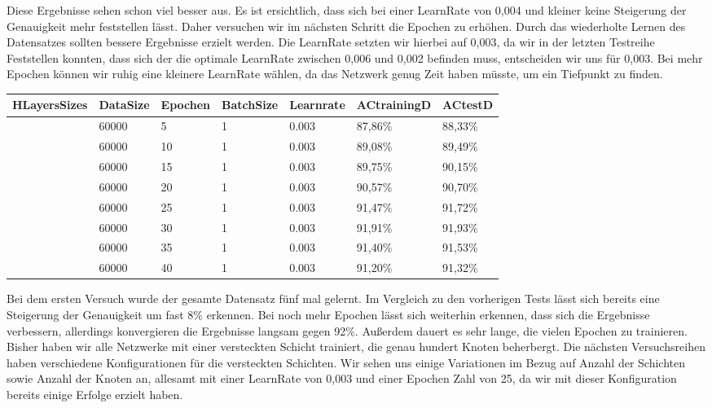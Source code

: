 \documentclass[12pt]{article}
\begin{document}
	Diese Ergebnisse sehen schon viel besser aus. Es ist ersichtlich, dass sich bei einer LearnRate von 0,004 und kleiner keine Steigerung der Genauigkeit mehr feststellen lässt. Daher versuchen wir im nächsten Schritt die Epochen zu erhöhen. Durch das wiederholte Lernen des Datensatzes sollten bessere Ergebnisse erzielt werden. Die LearnRate setzten wir hierbei auf 0,003, da wir in der letzten Testreihe Feststellen konnten, dass sich der die optimale LearnRate zwischen 0,006 und 0,002 befinden muss, entscheiden wir uns für 0,003. Bei mehr Epochen können wir ruhig eine kleinere LearnRate wählen, da das Netzwerk genug Zeit haben müsste, um ein Tiefpunkt zu finden.
\begin{table}[H]
    \centering
    \begin{tabular}{|l|l|l|l|l|l|l|}
    \hline
        HLayersSizes & DataSize & Epochen & BatchSize & Learnrate & ACtrainingD & ACtestD \\ \hline
        [784, 100, 10] & 60000 & 5 & 1 & 0.003 & 87,86\% & 88,33\% \\ \hline
        [784, 100, 10] & 60000 & 10 & 1 & 0.003 & 89,08\% & 89,49\% \\ \hline
        [784, 100, 10] & 60000 & 15 & 1 & 0.003 & 89,75\% & 90,15\% \\ \hline
        [784, 100, 10] & 60000 & 20 & 1 & 0.003 & 90,57\% & 90,70\% \\ \hline
        [784, 100, 10] & 60000 & 25 & 1 & 0.003 & 91,47\% & 91,72\% \\ \hline
        [784, 100, 10] & 60000 & 30 & 1 & 0.003 & 91,91\% & 91,93\% \\ \hline
        [784, 100, 10] & 60000 & 35 & 1 & 0.003 & 91,40\% & 91,53\% \\ \hline
        [784, 100, 10] & 60000 & 40 & 1 & 0.003 & 91,20\% & 91,32\% \\ \hline
    \end{tabular}
\end{table}
Bei dem ersten Versuch wurde der gesamte Datensatz fünf mal gelernt. Im Vergleich zu den vorherigen Tests lässt sich bereits eine Steigerung der Genauigkeit um fast 8\% erkennen. Bei noch mehr Epochen lässt sich weiterhin erkennen, dass sich die Ergebnisse verbessern, allerdings konvergieren die Ergebnisse langsam gegen 92\%. Außerdem dauert es sehr lange, die vielen Epochen zu trainieren. Bisher haben wir alle Netzwerke mit einer versteckten Schicht trainiert, die genau hundert Knoten beherbergt. Die nächsten Versuchsreihen haben verschiedene Konfigurationen für die versteckten Schichten. Wir sehen uns einige Variationen im Bezug auf Anzahl der Schichten sowie Anzahl der Knoten an, allesamt mit einer LearnRate von 0,003 und einer Epochen Zahl von 25, da wir mit dieser Konfiguration bereits einige Erfolge erzielt haben. 
\end{document}
